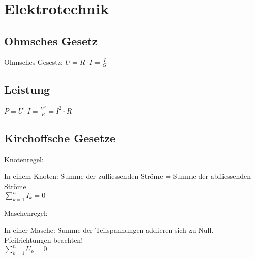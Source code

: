 \section{Elektrotechnik}
	
\begin{sectionbox}
	\subsection{Ohmsches Gesetz}

	\begin{emphbox}
	Ohmsches Gesestz: $ U = R \cdot I = \frac{I}{G} $
	\end{emphbox}

	\subsection{Leistung}

	\begin{emphbox}
	$ P = U \cdot I = \frac{U^2}{R} = I^2 \cdot R $
	\end{emphbox}
	

		
\end{sectionbox}

\begin{sectionbox}
	\subsection{Kirchoffsche Gesetze}

	Knotenregel:
	\begin{emphbox}
		In einem Knoten: Summe der zufliessenden Ströme = Summe der abfliessenden Ströme\\
		$\sum _{k=1}^{n}I_k = 0$
	\end{emphbox}
	
	Maschenregel:
	\begin{emphbox}
		In einer Masche: Summe der Teilspannungen addieren sich zu Null. Pfeilrichtungen beachten!\\
		$\sum _{k=1}^{n}U_k = 0$
	\end{emphbox}

\end{sectionbox}


